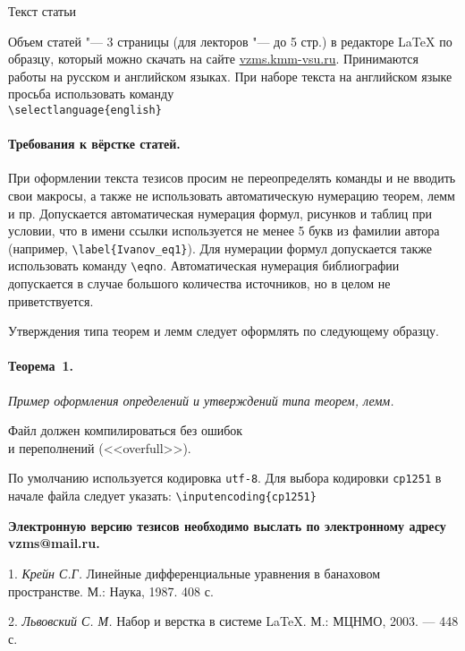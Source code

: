 \documentclass{vzmsthesis}
\begin{document}

\vzmscaption


Текст статьи


Объем статей "--- 3 страницы (для лекторов "--- до 5 стр.)
в редакторе LaTeX по образцу, который можно скачать на
сайте \href{https://vzms.kmm-vsu.ru}{vzms.kmm-vsu.ru}.
Принимаются работы на русском и английском языках.
При наборе текста на английском языке просьба использовать команду
\\\verb`\selectlanguage{english}`

\paragraph{Требования к вёрстке статей.}
При оформлении текста тезисов просим не переопределять команды и не
вводить свои макросы, а также не использовать автоматическую
нумерацию теорем, лемм и пр.
Допускается автоматическая нумерация формул, рисунков и таблиц
при условии, что в имени ссылки используется не менее 5 букв из фамилии автора
(например, \verb`\label{Ivanov_eq1}`).
Для нумерации формул допускается также использовать команду \verb"\eqno".
Автоматическая нумерация библиографии допускается в случае большого количества источников,
но в целом не приветствуется.

Утверждения типа теорем и лемм следует оформлять по следующему
образцу.

\paragraph{Теорема~1.} {\it
	Пример оформления определений и утверждений типа теорем, лемм.
}

\begin{center}
    Файл должен компилироваться без ошибок \\
    и переполнений (<<overfull>>).
\end{center}

По умолчанию используется кодировка \verb`utf-8`.
Для выбора кодировки \verb`cp1251` в начале файла следует указать:
\verb`\inputencoding{cp1251}`


\begin{center}
    \textbf{Электронную версию тезисов необходимо выслать по электронному адресу vzms@mail.ru.}
\end{center}

\litlist

1. {\it Крейн С.Г.} Линейные дифференциальные уравнения в банаховом пространстве. М.: Наука, 1987. 408 с.

2. {\it Львовский С. М.} Набор и верстка в системе \LaTeX. М.: МЦНМО, 2003. — 448 с.
\end{document}
